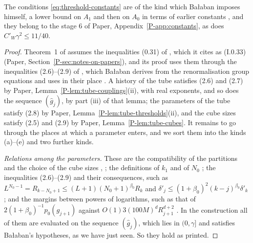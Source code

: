 \documentclass[11pt]{preprint}
\numberwithin{equation}{section}
\theoremstyle{definition}
\theoremstyle{remark}
\theoremstyle{plain}
\begin{document}
The conditions \eqref{eq:threshold-constants} are of the kind which Ba{\l}aban imposes himself, a lower bound on $A_1$ and then on $A_0$ in terms of earlier constants \cite[p.~246, p.~265]{BalabanCRE}, and they belong to the stage $6$ of Paper, Appendix~\ref{P-app:constants}, as does $C'_W\gamma^2 \leq 11/40$.

\begin{proof}
Theorem~1 of \cite[p.~262]{BalabanCRE} assumes the inequalities (0.31) of \cite[p.~259]{BalabanRG1}, which it cites as (I.0.33) (Paper, Section~\ref{P-sec:notes-on-papers}), and its proof uses them through the inequalities (2.6)--(2.9) of \cite[pp.~255--256]{BalabanCRE}, which Ba{\l}aban derives from the renormalisation group equations and uses in their place \cite[p.~255]{BalabanCRE}. A history of the tube satisfies (2.6) and (2.7) by Paper, Lemma~\ref{P-lem:tube-couplings}(ii), with real exponents, and so does the sequence $(\hat g_j)$, by part (iii) of that lemma; the parameters of the tube satisfy (2.8) by Paper, Lemma~\ref{P-lem:tube-thresholds}(ii), and the cube sizes satisfy (2.5) and (2.9) by Paper, Lemma~\ref{P-lem:tube-cubes}. It remains to go through the places at which a parameter enters, and we sort them into the kinds (a)--(e) and two further kinds.

\emph{Relations among the parameters.} These are the compatibility of the partitions and the choice of the cube sizes \cite[pp.~245, 264]{BalabanCRE}, \cite[p.~177]{BalabanLFR1}; the definitions of $k_1$ \cite[p.~270]{BalabanCRE} and of $N_0$ \cite[p.~179]{BalabanLFR1}; the inequalities (2.6)--(2.9) and their consequences, such as $L^{N_0-1} = R_{k-N_0+1} \leq (L + 1)(N_0 + 1)^{\beta_0}R_k$ and $\delta'_j \leq (1 + \beta_0)^2(k - j)^{\beta_0}\delta'_k$ \cite[p.~192]{BalabanLFR1}; and the margins between powers of logarithms, such as that of $2(1 + \beta_0)^{-1}p_0(g_{j+1})$ against $O(1)3(100M)^dR_{j+1}^{d+2}$ \cite[(1.88), p.~387]{BalabanLFR2}. In the construction all of them are evaluated on the sequence $(\hat g_j)$, which lies in $(0, \gamma]$ and satisfies Ba{\l}aban's hypotheses, as we have just seen. So they hold as printed.


\end{proof}
\end{document}
